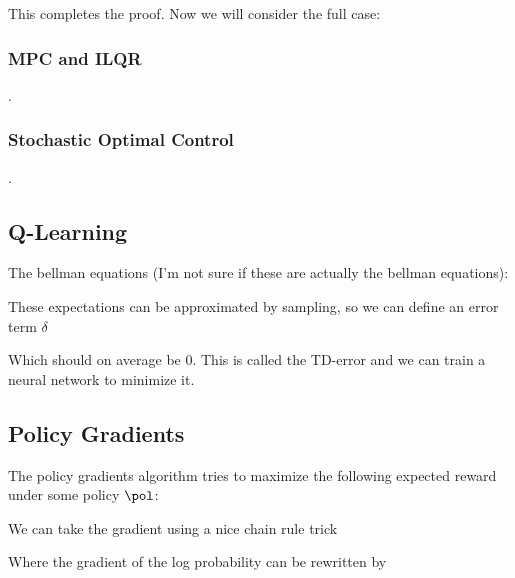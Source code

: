 \documentclass[12pt]{article}
\begin{document}
This completes the proof. Now we will consider the full case:


\subsubsection{MPC and ILQR}
.
\subsubsection{Stochastic Optimal Control}
.
\subsection{Q-Learning}

The bellman equations (I'm not sure if these are actually the bellman equations):


These expectations can be approximated by sampling, so we can define an error term $\delta$


Which should on average be 0. This is called the TD-error and we can train a neural network to minimize it.

\subsection{Policy Gradients}

The policy gradients algorithm tries to maximize the following expected reward under some policy $\pol$:


We can take the gradient using a nice chain rule trick


Where the gradient of the log probability can be rewritten by
\end{document}
